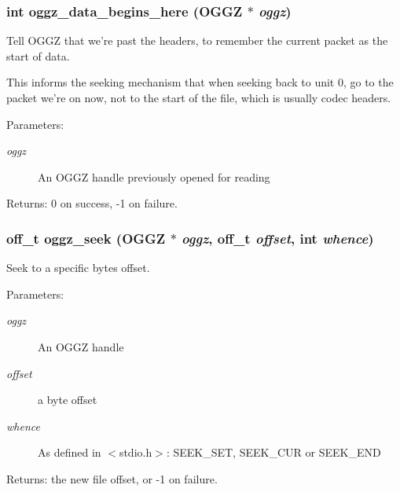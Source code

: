 \subsubsection{\setlength{\rightskip}{0pt plus 5cm}int oggz\_\-data\_\-begins\_\-here ({\bf OGGZ} $\ast$ {\em oggz})}\label{group__seeking__group_a4}


Tell OGGZ that we're past the headers, to remember the current packet as the start of data. 

This informs the seeking mechanism that when seeking back to unit 0, go to the packet we're on now, not to the start of the file, which is usually codec headers. \begin{Desc}
\item[Parameters:]
\begin{description}
\item[{\em oggz}]An OGGZ handle previously opened for reading \end{description}
\end{Desc}
\begin{Desc}
\item[Returns:]0 on success, -1 on failure. \end{Desc}
\subsubsection{\setlength{\rightskip}{0pt plus 5cm}off\_\-t oggz\_\-seek ({\bf OGGZ} $\ast$ {\em oggz}, off\_\-t {\em offset}, int {\em whence})}\label{group__seeking__group_a6}


Seek to a specific bytes offset. 

\begin{Desc}
\item[Parameters:]
\begin{description}
\item[{\em oggz}]An OGGZ handle \item[{\em offset}]a byte offset \item[{\em whence}]As defined in $<$stdio.h$>$: SEEK\_\-SET, SEEK\_\-CUR or SEEK\_\-END \end{description}
\end{Desc}
\begin{Desc}
\item[Returns:]the new file offset, or -1 on failure. \end{Desc}

